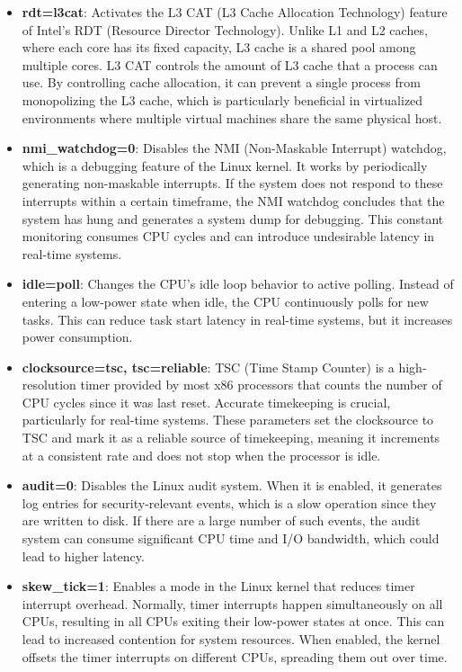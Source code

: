 \documentclass[MMR,Master,english]{style/twbook}
\begin{document}
\begin{itemize}
	\item \textbf{rdt=l3cat}: Activates the L3 CAT (L3 Cache Allocation Technology) feature of Intel's RDT (Resource Director Technology). Unlike L1 and L2 caches, where each core has its fixed capacity, L3 cache is a shared pool among multiple cores. L3 CAT controls the amount of L3 cache that a process can use. By controlling cache allocation, it can prevent a single process from monopolizing the L3 cache, which is particularly beneficial in virtualized environments where multiple virtual machines share the same physical host.
	\item \textbf{nmi\_watchdog=0}: Disables the NMI (Non-Maskable Interrupt) watchdog, which is a debugging feature of the Linux kernel. It works by periodically generating non-maskable interrupts. If the system does not respond to these interrupts within a certain timeframe, the NMI watchdog concludes that the system has hung and generates a system dump for debugging. This constant monitoring consumes CPU cycles and can introduce undesirable latency in real-time systems.
	\item \textbf{idle=poll}: Changes the CPU's idle loop behavior to active polling. Instead of entering a low-power state when idle, the CPU continuously polls for new tasks. This can reduce task start latency in real-time systems, but it increases power consumption.
	\item \textbf{clocksource=tsc, tsc=reliable}: TSC (Time Stamp Counter) is a high-resolution timer provided by most x86 processors that counts the number of CPU cycles since it was last reset. Accurate timekeeping is crucial, particularly for real-time systems. These parameters set the clocksource to TSC and mark it as a reliable source of timekeeping, meaning it increments at a consistent rate and does not stop when the processor is idle.
	\item \textbf{audit=0}: Disables the Linux audit system. When it is enabled, it generates log entries for security-relevant events, which is a slow operation since they are written to disk. If there are a large number of such events, the audit system can consume significant CPU time and I/O bandwidth, which could lead to higher latency.
	\item \textbf{skew\_tick=1}: Enables a mode in the Linux kernel that reduces timer interrupt overhead. Normally, timer interrupts happen simultaneously on all CPUs, resulting in all CPUs exiting their low-power states at once. This can lead to increased contention for system resources. When enabled, the kernel offsets the timer interrupts on different CPUs, spreading them out over time.

\end{itemize}
\end{document}
